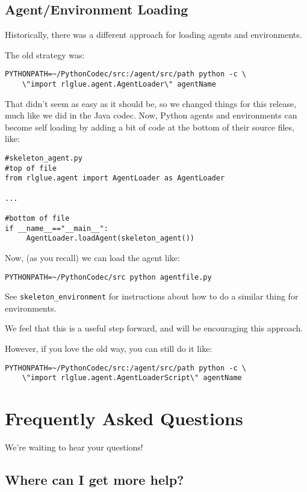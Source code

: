 \documentclass[11pt]{article}
\begin{document}
\subsection{Agent/Environment Loading}
Historically, there was a different approach for loading agents and environments.

The old strategy was:
\begin{verbatim}
PYTHONPATH=~/PythonCodec/src:/agent/src/path python -c \
    \"import rlglue.agent.AgentLoader\" agentName
\end{verbatim}

That didn't seem as easy as it should be, so we changed things for this release, much like we did in the Java codec. Now, Python agents and environments can become 
self loading by adding a bit of code at the bottom of their source files, like:
\begin{verbatim}
#skeleton_agent.py
#top of file
from rlglue.agent import AgentLoader as AgentLoader

...

#bottom of file
if __name__=="__main__":
     AgentLoader.loadAgent(skeleton_agent())
\end{verbatim}

Now, (as you recall) we can load the agent like:
\begin{verbatim}
PYTHONPATH=~/PythonCodec/src python agentfile.py
\end{verbatim}

See \texttt{skeleton\_environment} for instructions about how to do a similar thing for environments.

We feel that this is a useful step forward, and will be encouraging this approach.

However, if you love the old way, you can still do it like:

\begin{verbatim}
PYTHONPATH=~/PythonCodec/src:/agent/src/path python -c \
    \"import rlglue.agent.AgentLoaderScript\" agentName
\end{verbatim}


\section{Frequently Asked Questions}
We're waiting to hear your questions!

\subsection{Where can I get more help?}
\end{document}
